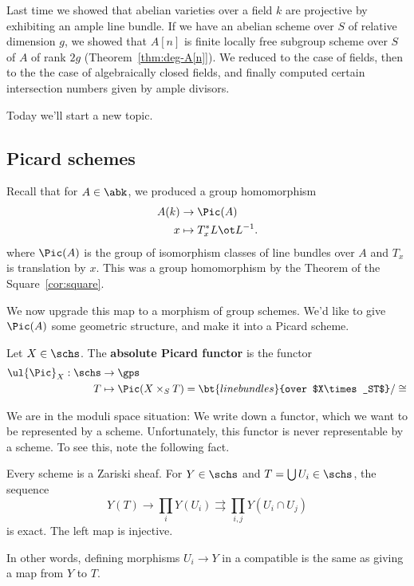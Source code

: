 
Last time we showed that abelian varieties over a field $k$ are projective by exhibiting an ample line bundle. If we have an abelian scheme over $S$ of relative dimension $g$, we showed that $A[n]$ is finite locally free subgroup scheme over $S$ of $A$ of rank ${2g}$ (Theorem~\ref{thm:deg-A[n]}). We reduced to the case of fields, then to the the case of algebraically closed fields, and finally computed certain intersection numbers given by ample divisors.

Today we'll start a new topic.

\subsection{Picard schemes}
Recall that for $A\in \abk$, we produced a group homomorphism
\begin{align*}
A(k)&\to \Pic(A)\\
x&\mapsto T_x^*L\ot L^{-1}.
\end{align*}
where $\Pic(A)$ is the group of isomorphism classes of line bundles over $A$ and  $T_x$ is translation by $x$. This was a group homomorphism by the Theorem of the Square~\ref{cor:square}.

We now upgrade this map to a morphism of group schemes. We'd like to give $\Pic(A)$ some geometric structure, and make it into a Picard scheme.

\begin{df}
Let $X\in \schs$. The \textbf{absolute Picard functor} is the functor
\begin{align*}
\ul{\Pic}_X:\schs&\to \gps\\
T&\mapsto \Pic(X\times_ST) =\bt{line bundles}{over $X\times_ST$}/\cong
\end{align*}
\end{df}
We are in the moduli space situation: We write down a functor, which we want to be represented by a scheme. Unfortunately, this functor is never representable by a scheme.
To see this, note the following fact.
\begin{fct}
Every scheme is a Zariski sheaf. For $Y\in \schs$ and $T=\bigcup U_i\in \schs$, the sequence
\[
Y(T)\to \prod_i Y(U_i)\rightrightarrows \prod_{i,j} Y(U_i\cap U_j)
\]
is exact. The left map is injective. %
\end{fct}
In other words, defining morphisms $U_i\to Y$ in a compatible is the same as giving a map from $Y$ to $T$. 

